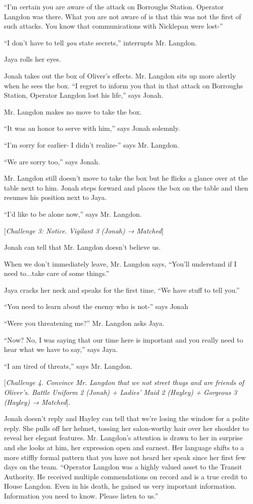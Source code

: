 ``I'm certain you are aware of the attack on Borroughs Station.  Operator Langdon was there.  What you are not aware of is that this was not the first of such attacks.  You know that communications with Nicklepan were lost-''

``I don't have to tell \textit{you }state secrets,'' interrupts Mr. Langdon.

Jaya rolls her eyes.

Jonah takes out the box of Oliver's effects.  Mr. Langdon sits up more alertly when he sees the box.  ``I regret to inform you that in that attack on Borroughs Station, Operator Langdon lost his life,'' says Jonah.

Mr. Langdon makes no move to take the box.

``It was an honor to serve with him,'' says Jonah solemnly.

``I'm sorry for earlier- I didn't realize-'' says Mr. Langdon.

``We are sorry too,'' says Jonah.

Mr. Langdon still doesn't move to take the box but he flicks a glance over at the table next to him.  Jonah steps forward and places the box on the table and then resumes his position next to Jaya.

``I'd like to be alone now,'' says Mr. Langdon.

{[}\textit{Challenge 3: Notice. }\textit{Vigilant }\textit{3 (Jonah) → Matched}{]} 

Jonah can tell that Mr. Langdon doesn't believe us.

When we don't immediately leave, Mr. Langdon says, ``You'll understand if I need to...take care of some things.''

Jaya cracks her neck and speaks for the first time, ``We have stuff to tell you.''

``You need to learn about the enemy who is not-'' says Jonah

``Were you threatening me?'' Mr. Langdon asks Jaya.

``Now?  No, I was saying that our time here is important and you really need to hear what we have to say,'' says Jaya.

``I am tired of threats,'' says Mr. Langdon.

{[}\textit{Challenge 4.  Convince Mr. Langdon that we not street thugs and are friends of Oliver's.  Battle Uniform 2 (Jonah) + Ladies' Maid 2 (Hayley) + Gorgeous 3 (Hayley)  → Matched}{]}. 

Jonah doesn't reply and Hayley can tell that we're losing the window for a polite reply.  She pulls off her helmet, tossing her salon-worthy hair over her shoulder to reveal her elegant features.  Mr. Langdon's attention is drawn to her in surprise and she looks at him, her expression open and earnest.  Her language shifts to a more stiffly formal pattern that you have not heard her speak since her first few days on the team.  ``Operator Langdon was a highly valued asset to the Transit Authority.  He received multiple commendations on record and is a true credit to House Langdon.  Even in his death, he gained us very important information.  Information you need to know.  Please listen to us.''





